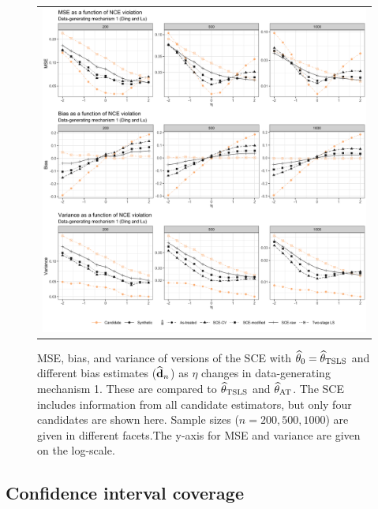 \documentclass{article}
\def\sat{_{\text{AT}}}
\def\stsls{_{\text{TSLS}}}
\begin{document}
\begin{figure}
\centering
\begin{tabular}{c}
\includegraphics[width =\textwidth]{figures/secondary-sim-synth-compare-plot.png}
\end{tabular}\vspace{0.2in}
\caption{MSE, bias, and variance of versions of the SCE with $\thetahat_0 = \thetahat\stsls$ and different bias estimates (${\widehat {{\bf d}}}_n$) as $\eta$ changes in data-generating mechanism 1. These are compared to $\thetahat\stsls$ and $\thetahat\sat$. The SCE includes information from all candidate estimators, but only four candidates are shown here. Sample sizes ($n = 200, 500, 1000$) are given in different facets.The y-axis for MSE and variance are given on the log-scale.}\label{sec-sim-pl2}
\end{figure}
%

\subsection{Confidence interval coverage}
\end{document}
